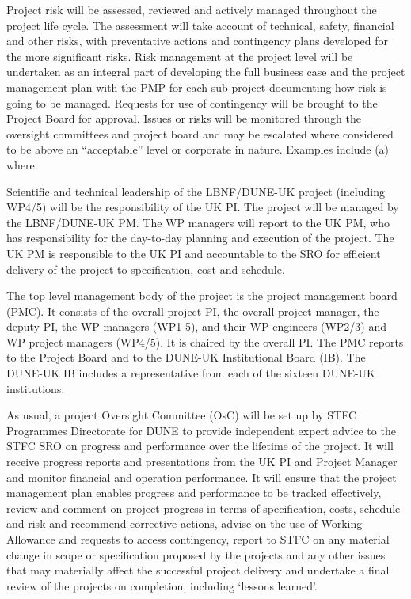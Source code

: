 Project risk will be assessed, reviewed and actively managed throughout the project life cycle. The assessment will take account of technical, safety, financial and other risks, with preventative actions and contingency plans developed for the more significant risks. Risk management at the project level will be undertaken as an integral part of developing the full business case and the project management plan with the PMP for each sub-project documenting how risk is going to be managed. Requests for use of contingency will be brought to the Project Board for approval. Issues or risks will be monitored through the oversight committees and project board and may be escalated where considered to be above an “acceptable” level or corporate in nature. Examples include (a) where

Scientific and technical leadership of the LBNF/DUNE-UK project (including WP4/5) will be the responsibility of the UK PI. The project will be managed by the LBNF/DUNE-UK PM. The WP managers will report to the UK PM, who has responsibility for the day-to-day planning and execution of the project. The UK PM is responsible to the UK PI and accountable to the SRO for efficient delivery of the project to specification, cost and schedule.

The top level management body of the project is the project management board (PMC). It consists of the overall project PI, the overall project manager, the deputy PI, the WP managers (WP1-5), and their WP engineers (WP2/3) and WP project managers (WP4/5). It is chaired by the overall PI. The PMC reports to the Project Board and to the DUNE-UK Institutional Board (IB). The DUNE-UK IB includes a representative from each of the sixteen DUNE-UK institutions.


As usual, a project Oversight Committee (OsC) will be set up by STFC Programmes Directorate for DUNE to provide independent expert advice to the STFC SRO on progress and performance over the lifetime of the project. It will receive progress reports and presentations from the UK PI and Project Manager and monitor financial and operation performance. It will ensure that the project management plan enables progress and performance to be tracked effectively, review and comment on project progress in terms of specification, costs, schedule and risk and recommend corrective actions, advise on the use of Working Allowance and requests to access contingency, report to STFC on any material change in scope or specification proposed by the projects and any other issues that may materially affect the successful project delivery and undertake a final review of the projects on completion, including ‘lessons learned’.

